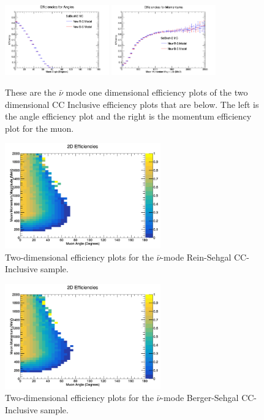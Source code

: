 \documentclass[11pt]{article}
\begin{document}
\begin{figure}[H]
\centering
\includegraphics[width=0.4\textwidth]{ANMCombinedPlotsImages/15-ANMCombinedPlots.png}
\includegraphics[width=0.4\textwidth]{ANMCombinedPlotsImages/16-ANMCombinedPlots.png}
\caption{These are the $\bar{\nu}$ mode one dimensional efficiency plots of the two dimensional CC Inclusive efficiency plots that are below. The left is the angle efficiency plot and the right is the momentum efficiency plot for the muon.}
\end{figure}

\begin{figure}[H]
\centering
\includegraphics[width=0.6\textwidth]{CCInclusivePlots/2DEffCompareANMRS.png}
\caption{Two-dimensional efficiency plots for the $\bar{\nu}$-mode Rein-Sehgal CC-Inclusive sample.}
\end{figure}

\begin{figure}[H]
\centering
\includegraphics[width=0.6\textwidth]{CCInclusivePlots/2DEffCompareANMBS.png}
\caption{Two-dimensional efficiency plots for the $\bar{\nu}$-mode Berger-Sehgal CC-Inclusive sample.}
\end{figure}
\end{document}

